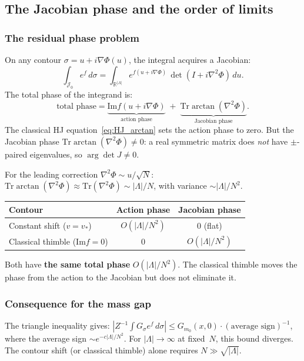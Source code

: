 \documentclass[12pt]{article}
\theoremstyle{definition}
\theoremstyle{remark}
\newcommand{\R}{\mathbb{R}}
\newcommand{\Tr}{\mathrm{Tr}}
\newcommand{\La}{\Lambda}
\newcommand{\im}{\mathrm{Im}}
\begin{document}
\subsection{The Jacobian phase and the order of limits}
\label{sec:order_of_limits}

\subsubsection{The residual phase problem}

On any contour $\sigma = u + i\nabla\Phi(u)$, the integral
acquires a Jacobian:
\begin{equation}\label{eq:jacobian_phase}
  \int_{\mathcal{J}_0} e^f\,d\sigma
    = \int_{\R^{|\La|}} e^{f(u+i\nabla\Phi)}\,
      \det(I + i\nabla^2\Phi)\,du.
\end{equation}
The total phase of the integrand is:
\begin{equation}
  \text{total phase} = \underbrace{\im f(u+i\nabla\Phi)}_{\text{action phase}}
    \;+\; \underbrace{\Tr\arctan(\nabla^2\Phi)}_{\text{Jacobian phase}}.
\end{equation}
The classical HJ equation~\eqref{eq:HJ_arctan} sets the action
phase to zero. But the Jacobian phase
$\Tr\arctan(\nabla^2\Phi) \ne 0$: a real symmetric matrix does
\emph{not} have $\pm$-paired eigenvalues, so $\arg\det J \ne 0$.

For the leading correction $\nabla^2\Phi \sim u/\sqrt{N}$:
$\Tr\arctan(\nabla^2\Phi) \approx \Tr(\nabla^2\Phi)
\sim |\La|/N$, with variance $\sim |\La|/N^2$.

\begin{center}
\begin{tabular}{|l|c|c|}
\hline
Contour & Action phase & Jacobian phase \\
\hline
Constant shift ($v = v_*$) & $O(|\La|/N^2)$ & 0 (flat) \\
Classical thimble ($\im f = 0$) & 0 & $O(|\La|/N^2)$ \\
\hline
\end{tabular}
\end{center}
Both have \textbf{the same total phase} $O(|\La|/N^2)$. The
classical thimble moves the phase from the action to the Jacobian
but does not eliminate it.

\subsubsection{Consequence for the mass gap}

The triangle inequality gives:
$|Z^{-1}\!\int G_\sigma e^f\,d\sigma|
  \le G_{m_0}(x,0) \cdot (\text{average sign})^{-1}$,
where the average sign $\sim e^{-c|\La|/N^2}$. For
$|\La| \to \infty$ at fixed~$N$, this bound diverges. The
contour shift (or classical thimble) alone requires
$N \gg \sqrt{|\La|}$.
\end{document}
